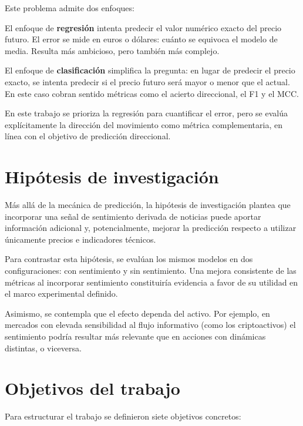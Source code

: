 Este problema admite dos enfoques:

El enfoque de \textbf{regresión} intenta predecir el valor numérico exacto del precio futuro. El error se mide en euros o dólares: cuánto se equivoca el modelo de media. Resulta más ambicioso, pero también más complejo.

El enfoque de \textbf{clasificación} simplifica la pregunta: en lugar de predecir el precio exacto, se intenta predecir si el precio futuro será mayor o menor que el actual. En este caso cobran sentido métricas como el acierto direccional, el F1 y el MCC.

En este trabajo se prioriza la regresión para cuantificar el error, pero se evalúa explícitamente la dirección del movimiento como métrica complementaria, en línea con el objetivo de predicción direccional.

\section{Hipótesis de investigación}

Más allá de la mecánica de predicción, la hipótesis de investigación plantea que incorporar una señal de sentimiento derivada de noticias puede aportar información adicional y, potencialmente, mejorar la predicción respecto a utilizar únicamente precios e indicadores técnicos.

Para contrastar esta hipótesis, se evalúan los mismos modelos en dos configuraciones: con sentimiento y sin sentimiento. Una mejora consistente de las métricas al incorporar sentimiento constituiría evidencia a favor de su utilidad en el marco experimental definido.

Asimismo, se contempla que el efecto dependa del activo. Por ejemplo, en mercados con elevada sensibilidad al flujo informativo (como los criptoactivos) el sentimiento podría resultar más relevante que en acciones con dinámicas distintas, o viceversa.

\section{Objetivos del trabajo}

Para estructurar el trabajo se definieron siete objetivos concretos:

